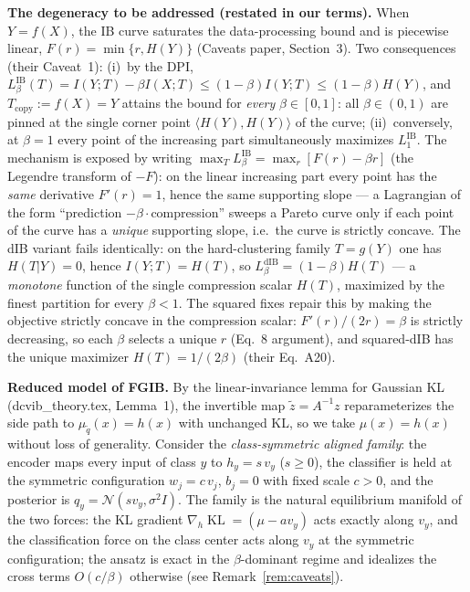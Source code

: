 \textbf{The degeneracy to be addressed (restated in our terms).}
When $Y = f(X)$, the IB curve saturates the data-processing bound and is piecewise linear,
$F(r) = \min\{r, H(Y)\}$ (Caveats paper, Section~3). Two consequences (their Caveat~1):
(i)~by the DPI, $L^{\mathrm{IB}}_\beta(T) = I(Y;T) - \beta I(X;T) \le (1-\beta)I(Y;T)
\le (1-\beta)H(Y)$, and $T_{\mathrm{copy}} := f(X) = Y$ attains the bound for
\emph{every} $\beta \in [0,1]$: all $\beta \in (0,1)$ are pinned at the single corner point
$\langle H(Y), H(Y)\rangle$ of the curve; (ii)~conversely, at $\beta = 1$ every point of the
increasing part simultaneously maximizes $L^{\mathrm{IB}}_1$. The mechanism is exposed by
writing $\max_T L^{\mathrm{IB}}_\beta = \max_r [F(r) - \beta r]$ (the Legendre transform of
$-F$): on the linear increasing part every point has the \emph{same} derivative
$F'(r) = 1$, hence the same supporting slope --- a Lagrangian of the form
``prediction $-\beta\cdot{}$compression'' sweeps a Pareto curve only if each point of the
curve has a \emph{unique} supporting slope, i.e.\ the curve is strictly concave.
The dIB variant fails identically: on the hard-clustering family $T = g(Y)$ one has
$H(T|Y) = 0$, hence $I(Y;T) = H(T)$, so $L^{\mathrm{dIB}}_\beta = (1-\beta)H(T)$ --- a
\emph{monotone} function of the single compression scalar $H(T)$, maximized by the finest
partition for every $\beta < 1$. The squared fixes repair this by making the objective
strictly concave in the compression scalar: $F'(r)/(2r) = \beta$ is strictly decreasing, so
each $\beta$ selects a unique $r$ (Eq.~8 argument), and squared-dIB has the unique maximizer
$H(T) = 1/(2\beta)$ (their Eq.~A20).

\textbf{Reduced model of FGIB.}
By the linear-invariance lemma for Gaussian KL (dcvib\_theory.tex, Lemma~1), the invertible
map $\tilde{z} = A^{-1}z$ reparameterizes the side path to $\mu_{\tilde q}(x) = h(x)$ with
unchanged KL, so we take $\mu(x) = h(x)$ without loss of generality.
Consider the \emph{class-symmetric aligned family}: the encoder maps every input of class $y$
to $h_y = s\,v_y$ ($s \ge 0$), the classifier is held at the symmetric configuration
$w_j = c\,v_j$, $b_j = 0$ with fixed scale $c > 0$, and the posterior is
$q_y = \mathcal{N}(s v_y, \sigma^2 I)$. The family is the natural equilibrium manifold of
the two forces: the KL gradient $\nabla_h \operatorname{KL} = (\mu - a v_y)$ acts exactly
along $v_y$, and the classification force on the class center acts along $v_y$ at the
symmetric configuration; the ansatz is exact in the $\beta$-dominant regime and idealizes
the cross terms $O(c/\beta)$ otherwise (see Remark~\ref{rem:caveats}).

